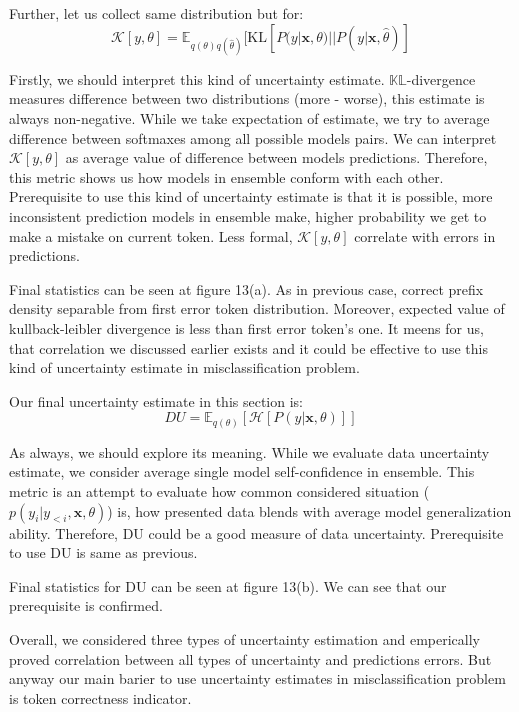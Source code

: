 \documentclass[a4paper,14pt]{extarticle}
\begin{document}
	Further, let us collect same distribution but for:
	\begin{equation*}
		\mathcal{K}[y, \theta] = \mathbb{E}_{q(\theta)q(\hat{\theta})}[
			\mathrm{KL}[P(y|\textbf{x}, \theta) || P(y|\textbf{x}, \hat{\theta})
		]
	\end{equation*}
	
	Firstly, we should interpret this kind of uncertainty estimate. $\mathbb{KL}$-divergence measures difference between two distributions (more - worse), this estimate is always non-negative. While we take expectation of estimate, we try to average difference between softmaxes among all possible models pairs. We can interpret $\mathcal{K}[y, \theta]$ as average value of difference between models predictions. Therefore, this metric shows us how models in ensemble conform with each other. Prerequisite to use this kind of uncertainty estimate is that it is possible, more inconsistent prediction models in ensemble make, higher probability we get to make a mistake on current token. Less formal, $\mathcal{K}[y, \theta]$ correlate with errors in predictions.
	
	Final statistics can be seen at figure 13(a). As in previous case, correct prefix density separable from first error token distribution. Moreover, expected value of kullback-leibler divergence is less than first error token's one. It meens for us, that correlation we discussed earlier exists and it could be effective to use this kind of uncertainty estimate in misclassification problem. 
	
	Our final uncertainty estimate in this section is:
	\begin{equation*}
		DU = \mathbb{E}_{q(\theta)}[\mathcal{H}[P(y| \textbf{x}, \theta)]]
	\end{equation*}
	
	As always, we should explore its meaning. While we evaluate data uncertainty estimate, we consider average single model self-confidence in ensemble. This metric is an attempt to evaluate how common considered situation ($p(y_i | y_{<i}, \textbf{x}, \theta)$) is, how presented data blends with average model generalization ability. Therefore, DU could be a good measure of data uncertainty. Prerequisite to use DU is same as previous.
	
	Final statistics for DU can be seen at figure 13(b). We can see that our prerequisite is confirmed.
	
	Overall, we considered three types of uncertainty estimation and emperically proved correlation between all types of uncertainty and predictions errors. But anyway our main barier to use uncertainty estimates in misclassification problem is token correctness indicator.
	
\end{document}
